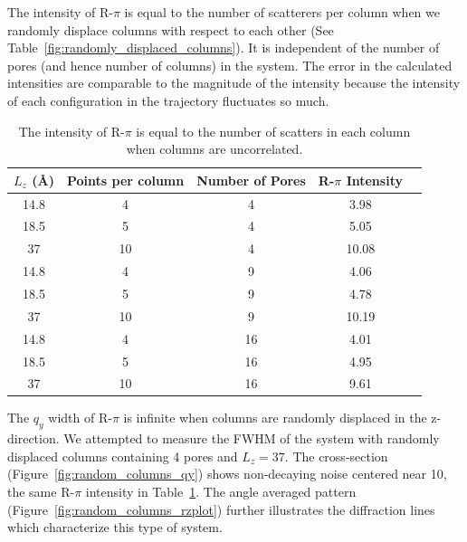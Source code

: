 \documentclass{article}
\begin{document}
  The intensity of R-$\pi$ is equal to the number of scatterers per
  column when we randomly displace columns with respect to each other (See
  Table~\ref{fig:randomly_displaced_columns}).  It is independent of the
  number of pores (and hence number of columns) in the system. The error 
  in the calculated intensities are comparable to the magnitude of the 
  intensity because the intensity of each configuration in the trajectory
  fluctuates so much. 

  \begin{table}[!htb]
  \centering
  \begin{tabular}{c c c c c}
  \toprule
  $L_z$ (\AA) & Points per column & Number of Pores &  R-$\pi$ Intensity\\ 
  \midrule
  14.8        &      4            & 4               & 3.98              \\
  18.5        &      5            & 4               & 5.05              \\
  37          &      10           & 4               & 10.08             \\
  14.8        &      4            & 9               & 4.06              \\
  18.5        &      5            & 9               & 4.78              \\
  37          &      10           & 9               & 10.19             \\
  14.8        &      4            & 16              & 4.01              \\
  18.5        &      5            & 16              & 4.95              \\
  37          &      10           & 16              & 9.61              \\
  \bottomrule
  \end{tabular}
  \caption{The intensity of R-$\pi$ is equal to the number of scatters in 
   each column when columns are uncorrelated.}\label{table:randomly_displaced_columns}
  \end{table}

  The $q_y$ width of R-$\pi$ is infinite when columns are randomly displaced in
  the z-direction. We attempted to measure the FWHM of the system with randomly
  displaced columns containing 4 pores and $L_z = 37$. The cross-section
  (Figure~\ref{fig:random_columns_qy}) shows non-decaying noise centered near 10,
  the same R-$\pi$ intensity in Table~\ref{table:randomly_displaced_columns}. The 
  angle averaged pattern (Figure~\ref{fig:random_columns_rzplot}) further illustrates
  the diffraction lines which characterize this type of system.
\end{document}
